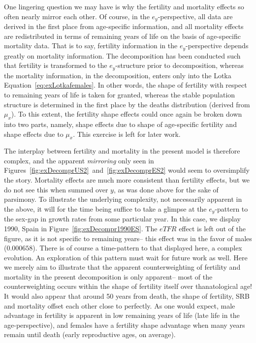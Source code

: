  One lingering question we may have is why the fertility and mortality effects
 so often nearly mirror each other. Of course, in the $e_y$-perspective, all
 data are derived in the first place from age-specific information, and all mortality
 effects are redistributed in terms of remaining years of life on the basis of
 age-specific mortality data. That is to say, fertility information in the
 $e_y$-perspective depends greatly on mortality information. The decomposition
 has been conducted such that fertility is transformed to the $e_y$-structure
 prior to decomposition, whereas the mortality information, in the
 decomposition, enters only into the Lotka Equation~\eqref{eq:exLotkafemales}.
 In other words, the shape of fertility with respect to remaining years of life is
 taken for granted, whereas the stable population structure is determined in the
 first place by the deaths distribution (derived from $\mu_x$). To this extent,
 the fertility shape effects could once again be broken down into two parts,
 namely, shape effects due to shape of age-specific fertility and shape effects
 due to $\mu_x$. This exercise is left for later work. 
 
The interplay between fertility and mortality in the present model is therefore
complex, and the apparent \textit{mirroring} only seen in
Figures~\ref{fig:exDecomprUS2}~and~\ref{fig:exDecomprES2} would seem to
oversimplify the story. Mortality effects are much more consistent than
fertility effects, but we do not see this when summed over $y$, as was done
above for the sake of parsimony. To illustrate the underlying complexity, not
necessarily apparent in the above, it will for the time being suffice to take a
glimpse at the $e_y$-pattern to the sex-gap in growth rates from some particular
year. In this case, we display 1990, Spain in Figure~\ref{fig:exDecompr1990ES}.
The $eTFR$ effect is left out of the figure, as it is not specific to
remaining years-- this effect was in the favor of males ($0.000658$). There is
of course a time-pattern to that displayed here, a complex evolution. An exploration 
of this pattern must wait for future work as well. Here we merely aim to illustrate 
that the apparent counterweighting of fertility and mortality in the present decomposition is only
apparent-- most of the counterweighting occurs within the shape of fertility
itself over thanatological age! It would also appear that around 50 years from
death, the shape of fertility, SRB and mortality offset each other close to
perfectly. As one would expect, male advantage in fertility is apparent in low
remaining years of life (late life in the age-perspective), and females have a
fertility shape advantage when many years remain until death (early
reproductive ages, on average). 

